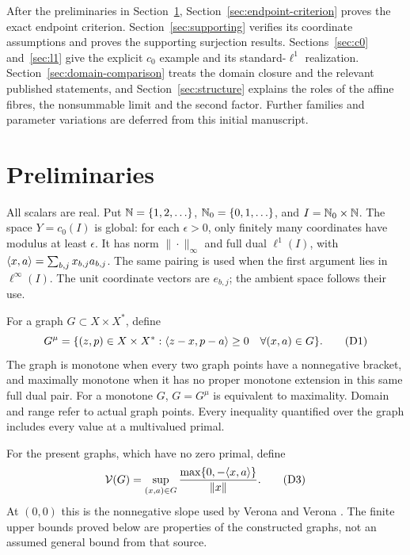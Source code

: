 After the preliminaries in Section~\ref{sec:definitions},
Section~\ref{sec:endpoint-criterion} proves the exact endpoint criterion.
Section~\ref{sec:supporting} verifies its coordinate assumptions and proves
the supporting surjection results. Sections~\ref{sec:c0} and~\ref{sec:l1}
give the explicit $c_0$ example and its standard-$\ell^1$ realization.
Section~\ref{sec:domain-comparison} treats the domain closure and the
relevant published statements, and Section~\ref{sec:structure} explains
the roles of the affine fibres, the nonsummable limit and the second
factor. Further families and parameter variations are deferred from
this initial manuscript.


\section{Preliminaries}
\label{sec:definitions}
All scalars are real. Put $\mathbb N=\{1,2,\ldots\}$, $\mathbb N_0=\{0,1,\ldots\}$,
and $I=\mathbb N_0\times\mathbb N$. The space $Y=c_0(I)$ is global: for each
$\epsilon>0$, only finitely many coordinates have modulus at least
$\epsilon$. It has norm $\|\cdot\|_\infty$ and full dual $\ell^1(I)$,
with $\langle x,a\rangle=\sum_{b,j}x_{b,j}a_{b,j}$.
The same pairing is used when the first argument lies in $\ell^\infty(I)$.
The unit coordinate vectors are $e_{b,j}$; the ambient space follows their use.

For a graph $G\subset X\times X^*$, define
\begin{equation}
G^\mu=\{(z,p)\in X\times X^*:
 \langle z-x,p-a\rangle\ge0\quad\forall(x,a)\in G\}.
\tag{D1}\label{eq:D1}
\end{equation}
The graph is monotone when every two graph points have a nonnegative bracket,
and maximally monotone when it has no proper monotone extension in this same
full dual pair. For a monotone $G$, $G=G^\mu$ is equivalent to maximality.
Domain and range refer to actual graph points. Every inequality quantified
over the graph includes every value at a multivalued primal.


For the present graphs, which have no zero primal, define
\begin{equation}
\mathcal V(G)=\sup_{(x,a)\in G}
 \frac{\max\{0,-\langle x,a\rangle\}}{\|x\|}.
\tag{D3}\label{eq:D3}
\end{equation}
At $(0,0)$ this is the nonnegative slope used by Verona and Verona
\cite{verona2008}. The finite upper bounds proved below are properties
of the constructed graphs, not an assumed general bound from that source.

